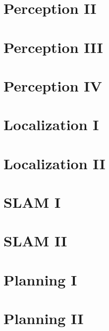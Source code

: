 \documentclass[landscape]{article}
\begin{document}
\begin{multicols}{3}
\blindtext[3]

\section{Perception II}

\blindtext[3]

\section{Perception III}

\blindtext[3]

\section{Perception IV}

\blindtext[3]

\section{Localization I}

\blindtext[3]

\section{Localization II}

\blindtext[3]

\section{SLAM I}

\blindtext[3]

\section{SLAM II}

\blindtext[3]

\section{Planning I}

\blindtext[3]

\section{Planning II}

\blindtext[3]





\end{multicols}
\end{document}
